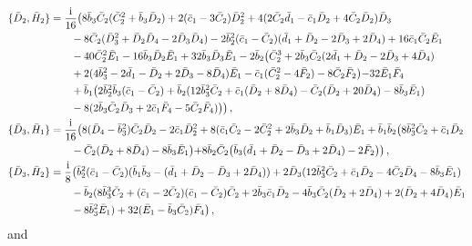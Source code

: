 \documentclass[10pt]{amsart}
\theoremstyle{definition}
\theoremstyle{corollary}
\theoremstyle{remark}
\theoremstyle{conclusion}
\begin{document}
 \begin{align} 
\{\bar{D}_2, \bar{H}_2\}&=\frac{{\rm i}}{16}\bigl( 8 \bar{b}_3 \bar{C}_2 (\bar{C}_2^2+\bar{b}_3 \bar{D}_2)+2(\bar{c}_1-3\bar{C}_2)\bar{D}_2^2+4(2\bar{C}_2 \bar{d}_1-\bar{c}_1\bar{D}_2+4\bar{C}_2\bar{D}_2)\bar{D}_3 \nonumber \\
& \hskip 0.7 cm -8 \bar{C}_2(\bar{D}_3^2+\bar{D}_2 \bar{D}_4-2 \bar{D}_3 \bar{D}_4)-2\bar{b}_2^2(\bar{c}_1-\bar{C}_2)(\bar{d}_1+\bar{D}_2-2\bar{D}_3+2\bar{D}_4)+16 \bar{c}_1 \bar{C}_2 \bar{E}_1 \nonumber \\
& \hskip 0.7 cm -40 \bar{C}_2^2 \bar{E}_1-16 \bar{b}_3 \bar{D}_2 \bar{E}_1+32 \bar{b}_3 \bar{D}_3 \bar{E}_1-2\bar{b}_2 \bigl( \bar{C}_2^3+2 \bar{b}_3 \bar{C}_2(2 \bar{d}_1+\bar{D}_2-2\bar{D}_3+4\bar{D}_4)\nonumber\\
& \hskip 0.7 cm+2(4 \bar{b}_3^2-2\bar{d}_1-\bar{D}_2+2\bar{D}_3-8\bar{D}_4)\bar{E}_1-\bar{c}_1(\bar{C}_2^2-4\bar{F}_2)-8\bar{C}_2 \bar{F}_2\bigl)-32 \bar{E}_1 \bar{F}_4\nonumber \\
& \hskip 0.7 cm +\bar{b}_1 \bigl( 2 \bar{b}_2^2 \bar{b}_3(\bar{c}_1-\bar{C}_2)+\bar{b}_2 (12 \bar{b}_3^2 \bar{C}_2+\bar{c}_1(\bar{D}_2+8\bar{D}_4)-\bar{C}_2(\bar{D}_2+20 \bar{D}_4)-8 \bar{b}_3 \bar{E}_1)\nonumber \\
& \hskip 0.7 cm -8(2 \bar{b}_3 \bar{C}_2 \bar{D}_3+2 \bar{c}_1 \bar{F}_4-5 \bar{C}_2 \bar{F}_4)\bigl)\bigl) \, ,\nonumber \\
\{\bar{D}_3, \bar{H}_1\}&=\frac{{\rm i}}{16}\bigl(8(\bar{D}_4-\bar{b}_3^2)\bar{C}_2 \bar{D}_2-2 \bar{c}_1\bar{D}_2^2+8(\bar{c}_1\bar{C}_2-2\bar{C}_2^2+2\bar{b}_3 \bar{D}_2+\bar{b}_1\bar{D}_3)\bar{E}_1+\bar{b}_1\bar{b}_2\bigl( 8 \bar{b}_3^2\bar{C}_2+\bar{c}_1 \bar{D}_2 \nonumber\\
& \hskip 0.7 cm-\bar{C}_2(\bar{D}_2+8\bar{D}_4)-8\bar{b}_3 \bar{E}_1\bigl)+8 \bar{b}_2\bar{C}_2\bigl( \bar{b}_3(\bar{d}_1+\bar{D}_2-\bar{D}_3+2\bar{D}_4)-2\bar{F}_2\bigl) \bigl) \, ,\nonumber \\
\{\bar{D}_3, \bar{H}_2\}&=\frac{{\rm i}}{8}\bigl( \bar{b}_2^2(\bar{c}_1-\bar{C}_2)(\bar{b}_1 \bar{b}_3-(\bar{d}_1+\bar{D}_2-\bar{D}_3+2\bar{D}_4))+2 \bar{D}_3 (12 \bar{b}_3^2 \bar{C}_2+\bar{c}_1 \bar{D}_2-4\bar{C}_2 \bar{D}_4-8\bar{b}_3 \bar{E}_1)\nonumber \\
& \hskip 0.7 cm-\bar{b}_2(8\bar{b}_3^3 \bar{C}_2+(\bar{c}_1-2\bar{C}_2)(\bar{c}_1-\bar{C}_2)\bar{C}_2+2\bar{b}_3 \bar{c}_1\bar{D}_2-4 \bar{b}_3 \bar{C}_2(\bar{D}_2+2\bar{D}_4)+2(\bar{D}_2+4\bar{D}_4) \bar{E}_1 \nonumber \\
& \hskip 0.7 cm-8 \bar{b}_3^2 \bar{E}_1)+32 (\bar{E}_1-\bar{b}_3 \bar{C}_2)\bar{F}_4 \bigl) \, ,
\end{align} and
\end{document}
